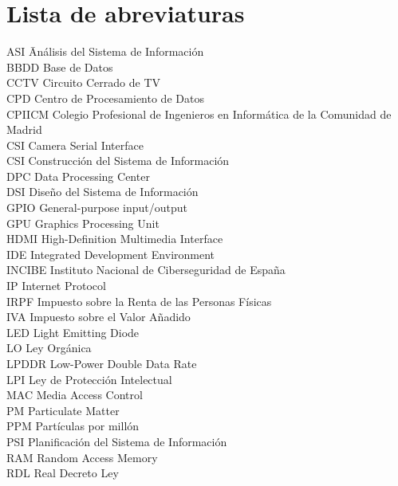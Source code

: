 \newpage %
\thispagestyle{empty}
\mbox{}

\chapter*{Lista de abreviaturas}
\begin{tabbing}  %
	ASI \quad\quad\quad\= Análisis del Sistema de Información \\
	BBDD \> Base de Datos \\
	CCTV \> Circuito Cerrado de TV \\
	CPD \> Centro de Procesamiento de Datos \\
	CPIICM \> Colegio Profesional de Ingenieros en Informática de la Comunidad de Madrid \\
	CSI \> Camera Serial Interface \\
	CSI \> Construcción del Sistema de Información \\
	DPC \> Data Processing Center \\
	DSI \> Diseño del Sistema de Información \\
	GPIO \> General-purpose input/output \\
	GPU \> Graphics Processing Unit \\
	HDMI \> High-Definition Multimedia Interface \\
	IDE \> Integrated Development Environment \\
	INCIBE \> Instituto Nacional de Ciberseguridad de España \\
	IP \> Internet Protocol \\
	IRPF \> Impuesto sobre la Renta de las Personas Físicas \\
	IVA \> Impuesto sobre el Valor Añadido \\
	LED \> Light Emitting Diode \\
	LO \> Ley Orgánica \\
	LPDDR \> Low-Power Double Data Rate \\
	LPI \> Ley de Protección Intelectual \\
	MAC \> Media Access Control \\
	PM \> Particulate Matter \\
	PPM \> Partículas por millón \\
	PSI \> Planificación del Sistema de Información \\
	RAM \> Random Access Memory \\
	RDL \> Real Decreto Ley \\

\end{tabbing}
